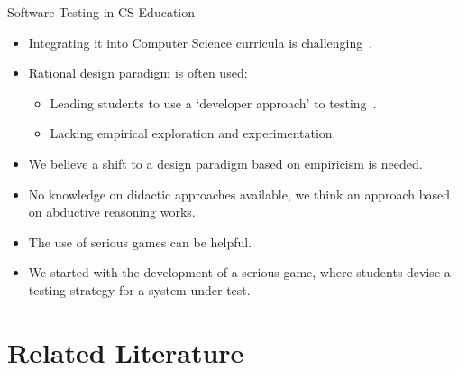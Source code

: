 \documentclass[aspectratio=169]{beamer}
\begin{document}
\begin{frame}{Software Testing in CS Education}
\begin{itemize}
    \item Integrating it into Computer Science curricula is challenging~\cite{garousi2020software, scatalon2020teaching}.
    \item Rational design paradigm is often used:
    \begin{itemize}
        \item Leading students to use a `developer approach' to testing~\cite{doorn2023towards}.
        \item Lacking empirical exploration and experimentation.
    \end{itemize} 
    \item We believe a shift to a design paradigm based on empiricism is needed.
    \item No knowledge on didactic approaches available, we think an approach based on abductive reasoning works.
    \item The use of serious games can be helpful.
    \item We started with the development of a serious game, where students devise a testing strategy for a system under test.
\end{itemize}
\end{frame}

\section{Related Literature}
\end{document}
